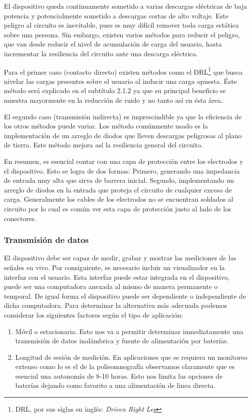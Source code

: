 El dispositivo queda continuamente sometido a varias descargas eléctricas de baja potencia y potencialmente sometido a descargas cortas de alto voltaje. Este peligro al circuito es inevitable, pues es muy difícil remover toda carga estática sobre una persona. Sin embargo, existen varios métodos para reducir el peligro, que van desde reducir el nivel de acumulación de carga del usuario, hasta incrementar la resiliencia del circuito ante una descarga eléctrica.

Para el primer caso (contacto directo) existen métodos como el DRL\footnote{DRL, por sus siglas en inglés: \emph{Driven Right Leg}} \cite{Winter1983} que busca nivelar las cargas presentes sobre el usuario al inducir una carga opuesta. Éste método será explicado en el subtítulo 2.1.2 ya que su principal beneficio se muestra mayormente en la reducción de ruido y no tanto así en ésta área.

El segundo caso (transmisión indirecta) es imprescindible ya que la eficiencia de los otros métodos puede variar. Los método comúnmente usado es la implementación de un arreglo de diodos que lleven descargas peligrosas al plano de tierra. Este método mejora así la resiliencia general del circuito. 

En resumen, es esencial contar con una capa de protección entre los electrodos y el dispositivo. Esto se logra de dos formas: Primero, generando una impedancia de entrada muy alta que sirva de barrera inicial. Segundo, implementando un arreglo de diodos en la entrada que proteja el circuito de cualquier exceso de carga. Generalmente los cables de los electrodos no se encuentran soldados al circuito por lo cual es común ver esta capa de protección justo al lado de los conectores.

\subsubsection{Transmisión de datos}
\label{sec:orgdf7e434}
El dispositivo debe ser capaz de medir, grabar y mostrar las mediciones de las señales en vivo. Por consiguiente, es necesario incluir un visualizador en la interfaz con el usuario. Esta interfaz puede estar integrada en el dispositivo, puede ser una computadora anexada al mismo de manera permanente o temporal. De igual forma el dispositivo puede ser dependiente o independiente de dicha computadora. Para determinar la alternativa más adecuada podemos considerar los siguientes factores según el tipo de aplicación:

\begin{enumerate}
\item Móvil o estacionaria. Esto nos va a permitir determinar inmediatamente una transmisión de datos inalámbrica y fuente de alimentación por baterías.
\item Longitud de sesión de medición. En aplicaciones que se requiera un monitoreo extenso como lo es el de la polisomnografía observamos claramente que es esencial una autonomía de 8-10 horas. Esto nos limita las opciones de baterías dejando como favorito a una alimentación de linea directa.
\end{enumerate}


